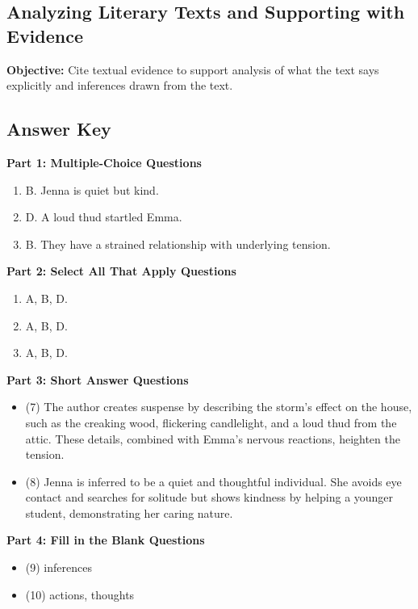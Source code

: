 \documentclass[12pt]{article}
\begin{document}
\subsection*{Analyzing Literary Texts and Supporting with Evidence}
\onehalfspacing

\begin{tcolorbox}[colframe=black!40, colback=gray!0, title=Learning Objective]
\textbf{Objective:} Cite textual evidence to support analysis of what the text says explicitly and inferences drawn from the text.
\end{tcolorbox}


\subsection*{Answer Key}

\textbf{Part 1: Multiple-Choice Questions}
\begin{enumerate}[label=\arabic*.]
    \item B. Jenna is quiet but kind.  
    \item D. A loud thud startled Emma.  
    \item B. They have a strained relationship with underlying tension.  
\end{enumerate}

\textbf{Part 2: Select All That Apply Questions}
\begin{enumerate}[label=\arabic*.]
    \item A, B, D.  
    \item A, B, D.  
    \item A, B, D.  
\end{enumerate}

\textbf{Part 3: Short Answer Questions}
\begin{itemize}
    \item (7) The author creates suspense by describing the storm's effect on the house, such as the creaking wood, flickering candlelight, and a loud thud from the attic. These details, combined with Emma’s nervous reactions, heighten the tension.  
    \item (8) Jenna is inferred to be a quiet and thoughtful individual. She avoids eye contact and searches for solitude but shows kindness by helping a younger student, demonstrating her caring nature.  
\end{itemize}

\textbf{Part 4: Fill in the Blank Questions}
\begin{itemize}
    \item (9) inferences  
    \item (10) actions, thoughts  
\end{itemize}
\end{document}
